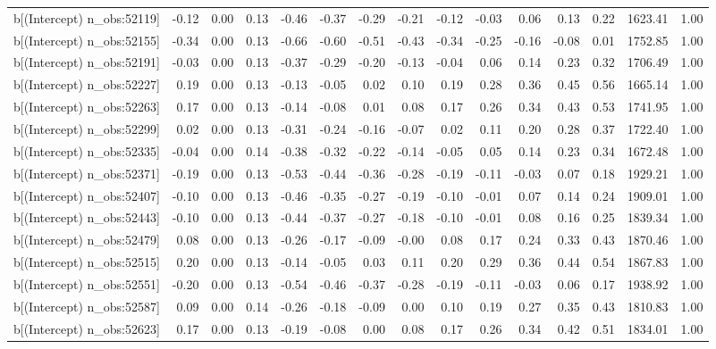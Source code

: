 \begin{table}[ht]
\begin{tabular}{rrrrrrrrrrrrrrr}
  b[(Intercept) n\_obs:52119] & -0.12 & 0.00 & 0.13 & -0.46 & -0.37 & -0.29 & -0.21 & -0.12 & -0.03 & 0.06 & 0.13 & 0.22 & 1623.41 & 1.00 \\ 
  b[(Intercept) n\_obs:52155] & -0.34 & 0.00 & 0.13 & -0.66 & -0.60 & -0.51 & -0.43 & -0.34 & -0.25 & -0.16 & -0.08 & 0.01 & 1752.85 & 1.00 \\ 
  b[(Intercept) n\_obs:52191] & -0.03 & 0.00 & 0.13 & -0.37 & -0.29 & -0.20 & -0.13 & -0.04 & 0.06 & 0.14 & 0.23 & 0.32 & 1706.49 & 1.00 \\ 
  b[(Intercept) n\_obs:52227] & 0.19 & 0.00 & 0.13 & -0.13 & -0.05 & 0.02 & 0.10 & 0.19 & 0.28 & 0.36 & 0.45 & 0.56 & 1665.14 & 1.00 \\ 
  b[(Intercept) n\_obs:52263] & 0.17 & 0.00 & 0.13 & -0.14 & -0.08 & 0.01 & 0.08 & 0.17 & 0.26 & 0.34 & 0.43 & 0.53 & 1741.95 & 1.00 \\ 
  b[(Intercept) n\_obs:52299] & 0.02 & 0.00 & 0.13 & -0.31 & -0.24 & -0.16 & -0.07 & 0.02 & 0.11 & 0.20 & 0.28 & 0.37 & 1722.40 & 1.00 \\ 
  b[(Intercept) n\_obs:52335] & -0.04 & 0.00 & 0.14 & -0.38 & -0.32 & -0.22 & -0.14 & -0.05 & 0.05 & 0.14 & 0.23 & 0.34 & 1672.48 & 1.00 \\ 
  b[(Intercept) n\_obs:52371] & -0.19 & 0.00 & 0.13 & -0.53 & -0.44 & -0.36 & -0.28 & -0.19 & -0.11 & -0.03 & 0.07 & 0.18 & 1929.21 & 1.00 \\ 
  b[(Intercept) n\_obs:52407] & -0.10 & 0.00 & 0.13 & -0.46 & -0.35 & -0.27 & -0.19 & -0.10 & -0.01 & 0.07 & 0.14 & 0.24 & 1909.01 & 1.00 \\ 
  b[(Intercept) n\_obs:52443] & -0.10 & 0.00 & 0.13 & -0.44 & -0.37 & -0.27 & -0.18 & -0.10 & -0.01 & 0.08 & 0.16 & 0.25 & 1839.34 & 1.00 \\ 
  b[(Intercept) n\_obs:52479] & 0.08 & 0.00 & 0.13 & -0.26 & -0.17 & -0.09 & -0.00 & 0.08 & 0.17 & 0.24 & 0.33 & 0.43 & 1870.46 & 1.00 \\ 
  b[(Intercept) n\_obs:52515] & 0.20 & 0.00 & 0.13 & -0.14 & -0.05 & 0.03 & 0.11 & 0.20 & 0.29 & 0.36 & 0.44 & 0.54 & 1867.83 & 1.00 \\ 
  b[(Intercept) n\_obs:52551] & -0.20 & 0.00 & 0.13 & -0.54 & -0.46 & -0.37 & -0.28 & -0.19 & -0.11 & -0.03 & 0.06 & 0.17 & 1938.92 & 1.00 \\ 
  b[(Intercept) n\_obs:52587] & 0.09 & 0.00 & 0.14 & -0.26 & -0.18 & -0.09 & 0.00 & 0.10 & 0.19 & 0.27 & 0.35 & 0.43 & 1810.83 & 1.00 \\ 
  b[(Intercept) n\_obs:52623] & 0.17 & 0.00 & 0.13 & -0.19 & -0.08 & 0.00 & 0.08 & 0.17 & 0.26 & 0.34 & 0.42 & 0.51 & 1834.01 & 1.00 \\ 

\end{tabular}
\end{table}

